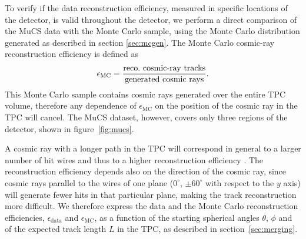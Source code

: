 \documentclass[a4paper,11pt]{article}
\def\myhyphen{{\hbox{-}}}
\begin{document}

To verify if the data reconstruction efficiency, measured in specific locations of the detector, is valid throughout the detector, we perform a direct comparison of the MuCS data with the Monte Carlo sample, using the Monte Carlo distribution generated as described in section \ref{sec:mcgen}.
The Monte Carlo cosmic-ray reconstruction efficiency is defined as
\begin{equation}
  \epsilon_{\mathrm{MC}} = \frac{\mathrm{reco.~cosmic\myhyphen ray~tracks}}{\mathrm{generated~cosmic~rays}}.
\end{equation}
This Monte Carlo sample contains cosmic rays generated over the entire TPC volume, therefore  any dependence of $\epsilon_{\mathrm{MC}}$ on the position of the cosmic ray in the TPC will cancel. The MuCS dataset, however, covers only three regions of the detector, shown in figure~\ref{fig:mucs}. %

A cosmic ray with a longer path in the TPC will correspond in general to a larger number of hit wires and thus to a higher reconstruction efficiency \cite{pandora2}. The reconstruction efficiency depends also on the direction of the cosmic ray, since cosmic rays parallel to the wires of one plane ($0^{\circ}$, $\pm60^{\circ}$ with respect to the $y$ axis) will generate fewer hits in that particular plane, making the track reconstruction more difficult.
We therefore express the data and the Monte Carlo reconstruction efficiencies, $\epsilon_{\mathrm{data}}$ and $\epsilon_{\mathrm{MC}}$, as a function of the starting spherical angles $\theta$, $\phi$ and of the expected track length $L$ in the TPC, as described in section~\ref{sec:merging}.
\end{document}
